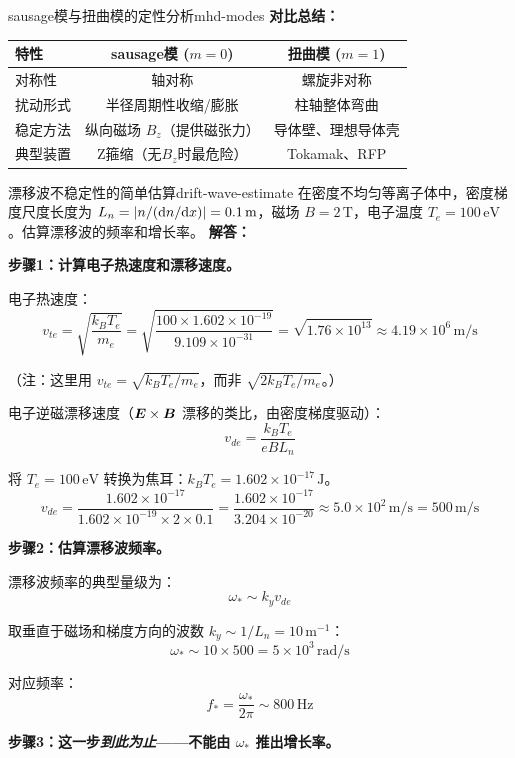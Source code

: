 \begin{example}{sausage模与扭曲模的定性分析}{mhd-modes}
\textbf{对比总结：}
\begin{center}
\begin{tabular}{lcc}
\toprule
\textbf{特性} & \textbf{sausage模} ($m=0$) & \textbf{扭曲模} ($m=1$) \\
\midrule
对称性 & 轴对称 & 螺旋非对称 \\
扰动形式 & 半径周期性收缩/膨胀 & 柱轴整体弯曲 \\
稳定方法 & 纵向磁场 $B_z$（提供磁张力） & 导体壁、理想导体壳 \\
典型装置 & Z箍缩（无$B_z$时最危险） & Tokamak、RFP \\
\bottomrule
\end{tabular}
\end{center}
\end{example}

\begin{example}{漂移波不稳定性的简单估算}{drift-wave-estimate}
在密度不均匀等离子体中，密度梯度尺度长度为 $L_n = |n/(\mathrm{d} n/\mathrm{d} x)| = 0.1\,\mathrm{m}$，磁场 $B = 2\,\mathrm{T}$，电子温度 $T_e = 100\,\mathrm{eV}$。估算漂移波的频率和增长率。
\tcblower
\textbf{解答：}

\textbf{步骤1：计算电子热速度和漂移速度。}

电子热速度：
\[
v_{te} = \sqrt{\frac{k_{\!B}T_e}{m_e}} = \sqrt{\frac{100\times 1.602\times 10^{-19}}{9.109\times 10^{-31}}}
= \sqrt{1.76\times 10^{13}} \approx 4.19\times 10^{6}\,\mathrm{m/s}
\]

（注：这里用 $v_{te} = \sqrt{k_{\!B}T_e/m_e}$，而非 $\sqrt{2k_{\!B}T_e/m_e}$。）

电子逆磁漂移速度（$\bm{E}\times\bm{B}$ 漂移的类比，由密度梯度驱动）：
\[
v_{de} = \frac{k_{\!B}T_e}{eBL_n}
\]

将 $T_e = 100\,\mathrm{eV}$ 转换为焦耳：$k_{\!B}T_e = 1.602\times 10^{-17}\,\mathrm{J}$。
\[
v_{de} = \frac{1.602\times 10^{-17}}{1.602\times 10^{-19}\times 2\times 0.1}
= \frac{1.602\times 10^{-17}}{3.204\times 10^{-20}}
\approx 5.0\times 10^{2}\,\mathrm{m/s} = 500\,\mathrm{m/s}
\]

\textbf{步骤2：估算漂移波频率。}

漂移波频率的典型量级为：
\[
\omega_* \sim k_y v_{de}
\]

取垂直于磁场和梯度方向的波数 $k_y \sim 1/L_n = 10\,\mathrm{m}^{-1}$：
\[
\omega_* \sim 10\times 500 = 5\times 10^{3}\,\mathrm{rad/s}
\]

对应频率：
\[
f_* = \frac{\omega_*}{2\pi} \sim 800\,\mathrm{Hz}
\]

\textbf{步骤3：这一步\emph{到此为止}——不能由 $\omega_*$ 推出增长率。}


\end{example}
